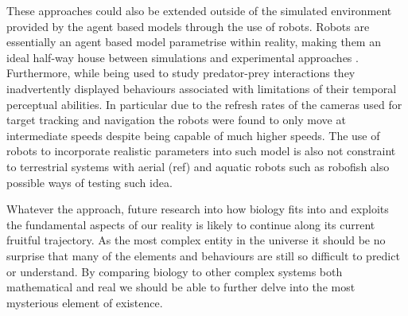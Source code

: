These approaches could also be extended outside of the simulated environment provided by the agent based models through the use of robots. Robots are essentially an agent based model parametrise within reality, making them an ideal half-way house between simulations and experimental approaches \citep{floreano2010evolution}. Furthermore, while being used to study predator-prey interactions they inadvertently displayed behaviours associated with limitations of their temporal perceptual abilities. In particular due to the refresh rates of the cameras used for target tracking and navigation the robots were found to only move at intermediate speeds despite being capable of much higher speeds. The use of robots to incorporate realistic parameters into such model is also not constraint to terrestrial systems with aerial (ref) and aquatic robots such as robofish \citep{faria2010novel} also possible ways of testing such idea.


Whatever the approach, future research into how biology fits into and exploits the fundamental aspects of our reality is likely to continue along its current fruitful trajectory. As the most complex entity in the universe it should be no surprise that many of the elements and behaviours are still so difficult to predict or understand. By comparing biology to other complex systems both mathematical and real we should be able to further delve into the most mysterious element of existence.












